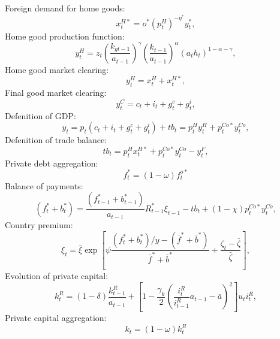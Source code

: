 \documentclass[12pt]{article}
\begin{document}
Foreign demand for home goods:
\begin{equation}
x_{t}^{H\ast }=o^{\ast }\left( p_{t}^{H}\right) ^{-\eta
^{\ast }}y_{t}^{\ast },  \label{eq:EE_11}
\end{equation}%
Home good production function:
\begin{equation}
y_{t}^{H}=z_{t} \left(\frac{k_{gt-1}}{a_{t-1}}\right)^{\gamma} \left(\frac{k_{t-1}}{a_{t-1}}\right) ^{\alpha
}(a_{t}h_{t})^{1-\alpha-\gamma },  \label{eq:EE_12}
\end{equation}%
Home good market clearing:
\begin{equation}
y_{t}^{H}=x_{t}^{H}+x_{t}^{H\ast },  \label{eq:EE_13}
\end{equation}%
Final good market clearing:
\begin{equation}
y_{t}^{C}=c_{t}+i_{t}+g^c_{t}+g^i_{t},  \label{eq:EE_14}
\end{equation}%
Defenition of GDP:
\begin{equation}
y_{t}=p_t\left(c_{t}+i_{t}+g^c_{t}+g^i_{t}\right)+tb_{t}=p_t^H y_t^H+p_t^{Co\ast}y_{t}^{Co},  \label{eq:EE_15}
\end{equation}%
Defenition of trade balance:
\begin{equation}
tb_{t}=p_{t}^{H}x_{t}^{H\ast }+p_{t}^{Co\ast }y_{t}^{Co}-y_{t}^F,
\label{eq:EE_16}
\end{equation}%
Private debt aggregation:
\begin{equation}
f_t^{\ast} = (1-\omega)f_t^{o\ast} \label{eq:EE_17}
\end{equation}
Balance of payments:
\begin{equation}
(f_t^* + b_{t}^{\ast })=\frac{(f_{t-1}^*+b_{t-1}^{\ast })}{a_{t-1}}R_{t-1}^{\ast }\xi _{t-1}-tb_{t}+(1-\chi )p_{t}^{Co\ast }y_{t}^{Co},
\label{eq:EE_18}
\end{equation}%
Country premium:
\begin{equation}
\xi _{t}=\bar{\xi}\exp \left[ \psi \frac{(f_t^* + b_{t}^{\ast})/y-(\bar{f}^{\ast} + \bar{b}^{\ast})}{\bar{f}^{\ast} + \bar{b}^{\ast}}+\frac{\zeta _{t}-\bar{\zeta} }{\bar{\zeta} }\right] ,
\label{eq:EE_19}
\end{equation}%
Evolution of private capital:
\begin{equation}
k_{t}^R=(1-\delta )\frac{k_{t-1}^R}{a_{t-1}}+\left[ 1-\frac{\gamma_k }{2}\left(
\frac{i^R_{t}}{i^R_{t-1}}a_{t-1}-\bar{a}\right) ^{2}\right] u_{t}i^R_{t},
\label{eq:EE_20}
\end{equation}%
Private capital aggregation:
\begin{equation}
k_t = (1-\omega)k_t^R
\label{eq:EE_21}
\end{equation}
\end{document}
